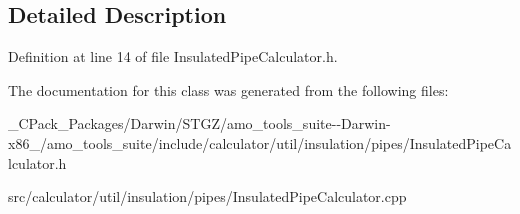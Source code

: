 \subsection{Detailed Description}


Definition at line 14 of file Insulated\+Pipe\+Calculator.\+h.



The documentation for this class was generated from the following files\+:\begin{DoxyCompactItemize}
\item 
\+\_\+\+C\+Pack\+\_\+\+Packages/\+Darwin/\+S\+T\+G\+Z/amo\+\_\+tools\+\_\+suite-\/-\/\+Darwin-\/x86\+\_/amo\+\_\+tools\+\_\+suite/include/calculator/util/insulation/pipes/Insulated\+Pipe\+Calculator.\+h\item 
src/calculator/util/insulation/pipes/Insulated\+Pipe\+Calculator.\+cpp\end{DoxyCompactItemize}
